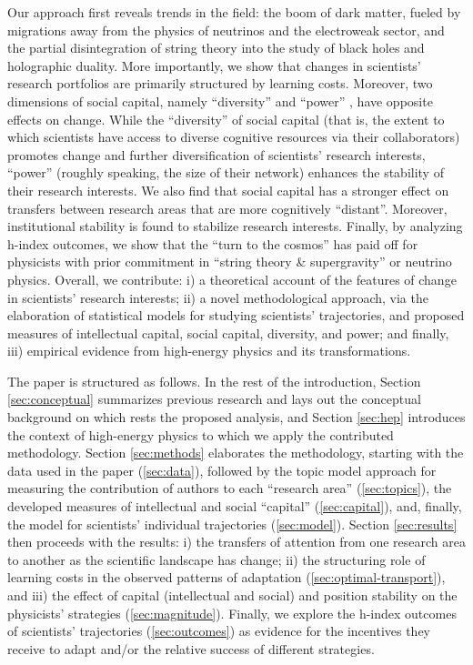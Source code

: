 \documentclass{article}
\begin{document}
Our approach first reveals trends in the field: the boom of dark matter, fueled by migrations away from the physics of neutrinos and the electroweak sector, and the partial disintegration of string theory into the study of black holes and holographic duality. More importantly, we show that changes in scientists' research portfolios are primarily structured by learning costs. Moreover, two dimensions of social capital, namely ``diversity'' and ``power'' \citep{Abbasi2014}, have opposite effects on change. While the ``diversity'' of social capital (that is, the extent to which scientists have access to diverse cognitive resources via their collaborators) promotes change and further diversification of scientists' research interests, ``power'' (roughly speaking, the size of their network) enhances the stability of their research interests. We also find that social capital has a stronger effect on transfers between research areas that are more cognitively ``distant''. Moreover, institutional stability is found to stabilize research interests. Finally, by analyzing h-index outcomes, we show that the ``turn to the cosmos'' has paid off for physicists with prior commitment in ``string theory \& supergravity'' or neutrino physics. Overall, we contribute: i) a theoretical account of the features of change in scientists' research interests; ii) a novel methodological approach, via the elaboration of statistical models for studying scientists' trajectories, and proposed measures of intellectual capital, social capital, diversity, and power; and finally, iii) empirical evidence from high-energy physics and its transformations.

The paper is structured as follows. In the rest of the introduction, Section \ref{sec:conceptual} summarizes previous research and lays out the conceptual background on which rests the proposed analysis, and Section \ref{sec:hep} introduces the context of high-energy physics to which we apply the contributed methodology. %
Section \ref{sec:methods} elaborates the methodology, starting with the data used in the paper (\ref{sec:data}), followed by the topic model approach for measuring the contribution of authors to each ``research area'' (\ref{sec:topics}), the developed measures of intellectual and social ``capital'' (\ref{sec:capital}), and, finally, the model for scientists' individual trajectories (\ref{sec:model}).
Section \ref{sec:results} then proceeds with the results: i) the transfers of attention from one research area to another as the scientific landscape has change; ii) the structuring role of learning costs in the observed patterns of adaptation (\ref{sec:optimal-transport}), and iii) the effect of capital (intellectual and social) and position stability on the physicists' strategies (\ref{sec:magnitude}). Finally, we explore the h-index outcomes of scientists' trajectories (\ref{sec:outcomes}) as evidence for the incentives they receive to adapt and/or the relative success of different strategies. 
\end{document}
